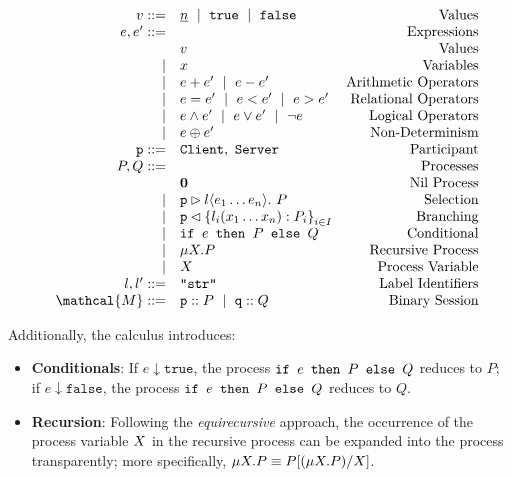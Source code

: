 \begin{figure}[!hb]
\doublespacing
\[
\begin{array}{rlr}
v ::= & \underline{n}~\mid~\texttt{true}~\mid~\texttt{false} 
	& \text{Values} \\
e, e' ::= & & \text{Expressions} \\
	& v & \text{Values} \\
\mid	 & x & \text{Variables} \\
\mid & e + e'~\mid~e - e' & \text{Arithmetic Operators} \\
\mid & e = e'~\mid~e < e' ~\mid~e > e' & \text{Relational Operators} \\
\mid & e \wedge e'~\mid~e \vee e' ~\mid~\neg e & \text{Logical Operators} \\
\mid & e \oplus e' & \text{Non-Determinism} \\

\mrole{p} ::= & \mrole{Client},~\mrole{Server} & \text{Participant} \\

P,Q ::= & & \text{Processes} \\
     & \mathbf{0} & \text{Nil Process} \\
\mid & \sel{p}{l}{e_1 \dots e_n}.~P & \text{Selection} \\
\mid & \bra{p}{l_i(x_1 \dots x_n): P_i}{i\in I} & \text{Branching} \\
\mid & \pcond{e}{P}{Q} & \text{Conditional} \\
\mid & \precursion{P} & \text{Recursive Process} \\
\mid & \precvar & \text{Process Variable} \\

l, l' ::= & \texttt{``str''} & \text{Label Identifiers} \\

\mathcal{M} ::= & \ptprocess{p}{P} ~\mid~ \ptprocess{q}{Q} 
	& \text{Binary Session} \\
\end{array}
\]
\singlespacing
{}
\label{fig:sync}
\end{figure}

Additionally, the calculus introduces:

\begin{itemize}
\item \textbf{Conditionals}: 
If $e \downarrow \texttt{true}$, 
the process $\texttt{if }{e}\texttt{ then }{P}\texttt{ else }{Q}$ reduces to $P$; 
if $e \downarrow \texttt{false}$, 
the process $\texttt{if }{e}\texttt{ then }{P}\texttt{ else }{Q}$ reduces to $Q$.

\item \textbf{Recursion}: 
Following the \textit{equirecursive} approach, 
the occurrence of the process variable $X$ 
in the recursive process can be 
expanded into the process transparently;
more specifically, $\mu X . {P} \equiv P[(\mu X . {P})/X]$.
\end{itemize}

